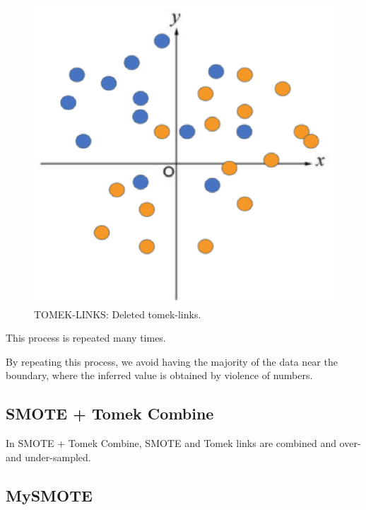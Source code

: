 \begin{center}
    \begin{figure}[ht]
        \caption{TOMEK-LINKS: Deleted tomek-links.}
        \label{tab:team-rating-features}
        \begin{center}
            \includegraphics[scale=0.6]{image/tomek3.eps}
        \end{center}
    \end{figure}
\end{center}

This process is repeated many times.

By repeating this process, we avoid having the majority of the data near the boundary, where the inferred value is obtained by violence of numbers.

\clearpage

\subsection{SMOTE + Tomek Combine}
In SMOTE + Tomek Combine, SMOTE and Tomek links are combined and over- and under-sampled.

\subsection{MySMOTE}

